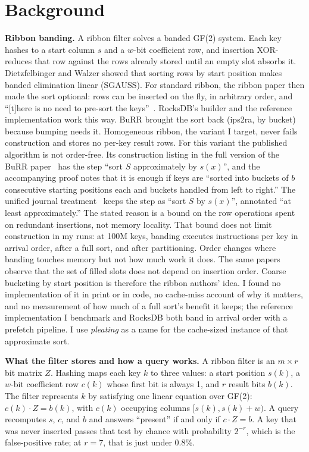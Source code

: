 \documentclass{article}
\begin{document}
\section{Background}\label{sec:background}
\textbf{Ribbon banding.} A ribbon filter solves a banded GF(2) system. Each key hashes to a start column $s$ and a $w$-bit coefficient row, and insertion XOR-reduces that row against the rows already stored until an empty slot absorbs it. Dietzfelbinger and Walzer showed that sorting rows by start position makes banded elimination linear (SGAUSS). For standard ribbon, the ribbon paper then made the sort optional: rows can be inserted on the fly, in arbitrary order, and ``[t]here is no need to pre-sort the keys''~\citep{dillinger2021ribbon}. RocksDB's builder and the reference implementation work this way. BuRR brought the sort back (ips2ra, by bucket) because bumping needs it. Homogeneous ribbon, the variant I target, never fails construction and stores no per-key result rows. For this variant the published algorithm is not order-free. Its construction listing in the full version of the BuRR paper~\citep{dillinger2021burrtr} has the step ``sort $S$ approximately by $s(x)$'', and the accompanying proof notes that it is enough if keys are ``sorted into buckets of $b$ consecutive starting positions each and buckets handled from left to right.'' The unified journal treatment~\citep{dietzfelbinger2026ribbon} keeps the step as ``sort $S$ by $s(x)$'', annotated ``at least approximately.'' The stated reason is a bound on the row operations spent on redundant insertions, not memory locality. That bound does not limit construction in my runs: at 100M keys, banding executes \bandinstrarrival{} instructions per key in arrival order, \bandinstrsorted{} after a full sort, and \bandinstrpleated{} after partitioning. Order changes where banding touches memory but not how much work it does. The same papers observe that the set of filled slots does not depend on insertion order. Coarse bucketing by start position is therefore the ribbon authors' idea. I found no implementation of it in print or in code, no cache-miss account of why it matters, and no measurement of how much of a full sort's benefit it keeps; the reference implementation I benchmark and RocksDB both band in arrival order with a prefetch pipeline. I use \emph{pleating} as a name for the cache-sized instance of that approximate sort.

\textbf{What the filter stores and how a query works.} A ribbon filter is an $m \times r$ bit matrix $Z$. Hashing maps each key $k$ to three values: a start position $s(k)$, a $w$-bit coefficient row $c(k)$ whose first bit is always 1, and $r$ result bits $b(k)$. The filter represents $k$ by satisfying one linear equation over GF(2): $c(k)\cdot Z = b(k)$, with $c(k)$ occupying columns $[s(k), s(k){+}w)$. A query recomputes $s$, $c$, and $b$ and answers ``present'' if and only if $c\cdot Z = b$. A key that was never inserted passes that test by chance with probability $2^{-r}$, which is the false-positive rate; at $r = 7$, that is just under 0.8\%.
\end{document}
